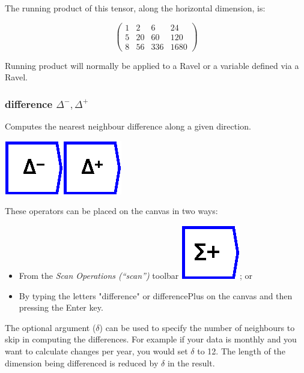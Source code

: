 The running product of this tensor, along the horizontal dimension,
is:

\[
\left(\begin{array}{cccc}
1 & 2 & 6 & 24\\
5 & 20 & 60 & 120\\
8 & 56 & 336 & 1680
\end{array}\right)
\]

Running product will normally be applied to a Ravel or a variable
defined via a Ravel.

\subsubsection{difference $\Delta^{-},\Delta^{+}$}

\label{Operation:difference}\label{Operation:differencePlus} Computes
the nearest neighbour difference along a given direction.

\includegraphics{images/difference}\includegraphics{images/differencePlus}

These operators can be placed on the canvas in two ways:
\begin{itemize}
\item From the \emph{Scan Operations (``scan'')} toolbar \includegraphics{images/runningSum};
or 
\item By typing the letters "difference" or \textquotedbl differencePlus\textquotedbl{}
on the canvas and then pressing the Enter key.
\end{itemize}
The optional argument ($\delta$) can be used to specify the number
of neighbours to skip in computing the differences. For example if
your data is monthly and you want to calculate changes per year, you
would set $\delta$ to 12. The length of the dimension being differenced
is reduced by $\delta$ in the result.

